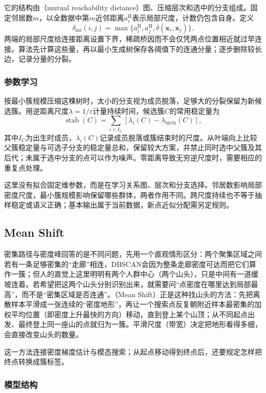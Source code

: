 它的结构由（mutual reachability distance）图、压缩层次和选中的分支组成。固定邻居数$m$，以全数据中第$m$近邻距离$a_i^{\mathrm H}$表示局部尺度，计数仍包含自身。定义
\[
 \delta_{\mathrm{mr}}(i,j)=\max\{a_i^{\mathrm H},a_j^{\mathrm H},\delta(\bm x_i,\bm x_j)\}.
\]
两端的局部尺度给连接距离设置下界，稀疏桥因而不会仅凭两点位置相近就过早连接。算法先计算这些量，再以最小生成树保存各阈值下的连通分量；逐步删除较长边，记录分量的分裂。

\subsubsection{参数学习}

按最小簇规模压缩这棵树时，太小的分支视为成员脱落，足够大的分裂保留为新候选簇。用逆距离尺度$\lambda=1/\varepsilon$计量持续时间，候选簇$C$的常用稳定量为
\[
 \operatorname{stab}(C)=\sum_{i\in I_C}
 [\lambda_i(C)-\lambda_{\mathrm{birth}}(C)],
\]
其中$I_C$为出生时成员，$\lambda_i(C)$记录成员脱落或簇结束时的尺度。从叶端向上比较父簇稳定量与可选子分支的稳定量总和，保留较大方案，并禁止同时选中父簇及其后代；未属于选中分支的点可以作为噪声。零距离导致无穷逆尺度时，需要相应的重复点处理。

这里没有拟合固定维参数，而是在学习关系图、层次和分支选择。邻居数影响局部密度尺度，最小簇规模影响保留哪些群体，两者作用不同。跨尺度持续也不等于抽样稳定或语义正确；基本输出属于当前数据，新点近似分配需另定规则。
\subsection{Mean Shift}
\label{sec:clustering-mean-shift}

密集路径与密度峰回答的是不同问题，先用一个直观情形区分：两个聚集区域之间若有一条足够密集的“走廊”相连，DBSCAN会因为整条走廊密度可达而把它们算作一簇；但人的直觉上这里明明有两个人群中心（两个山头），只是中间有一道缓坡连着。若希望把这两个山头分别识别出来，就需要问“点密度在哪里达到局部最高”，而不是“密集区域是否连通”。（Mean Shift）正是这种找山头的方法：先把离散样本平滑成一张连续的“密度地形”，再让一个搜索点反复朝附近样本最密集的加权平均位置（即密度上升最快的方向）移动，直到登上某个山顶；从不同起点出发、最终登上同一座山的点就归为一簇。平滑尺度（带宽）决定把地形看得多细，会直接改变山头的数量。

这一方法连接密度梯度估计与模态搜索；从起点移动得到终点后，还要规定怎样把终点转换成簇标签。

\subsubsection{模型结构}

